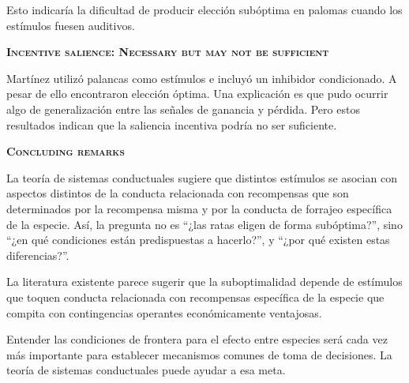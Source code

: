 \documentclass[a4paper,12pt]{article}
\begin{document}
Esto indicaría la dificultad de producir elección subóptima en palomas cuando los estímulos fuesen auditivos.

{\scshape\bfseries Incentive salience: Necessary but may not be sufficient}

Martínez utilizó palancas como estímulos e incluyó un inhibidor condicionado.
A pesar de ello encontraron elección óptima.
Una explicación es que pudo ocurrir algo de generalización entre las señales de ganancia y pérdida.
Pero estos resultados indican que la saliencia incentiva podría no ser suficiente.

{\scshape\bfseries Concluding remarks}

La teoría de sistemas conductuales sugiere que distintos estímulos se asocian con aspectos distintos de la conducta relacionada con recompensas que son determinados por la recompensa misma y por la conducta de forrajeo específica de la especie.
Así, la pregunta no es ``¿las ratas eligen de forma subóptima?'', sino ``¿en qué condiciones están predispuestas a hacerlo?'', y ``¿por qué existen estas diferencias?''.

La literatura existente parece sugerir que la suboptimalidad depende de estímulos que toquen conducta relacionada con recompensas específica de la especie que compita con contingencias operantes económicamente ventajosas.

Entender las condiciones de frontera para el efecto entre especies será cada vez más importante para establecer mecanismos comunes de toma de decisiones.
La teoría de sistemas conductuales puede ayudar a esa meta.
\end{document}
